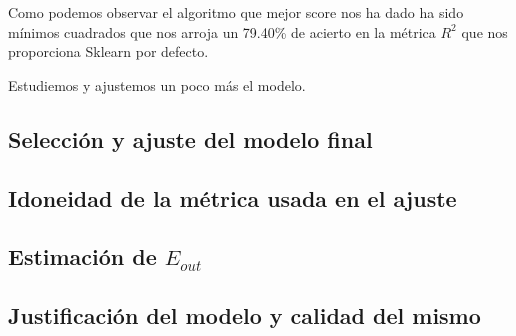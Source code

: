 \documentclass[12pt,a4paper]{article}
\begin{document}
Como podemos observar el algoritmo que mejor score nos ha dado ha sido mínimos cuadrados que nos arroja un 79.40\% de acierto en la métrica $R^2$ que nos proporciona Sklearn por defecto. 

Estudiemos y ajustemos un poco más el modelo.

\subsection{Selección y ajuste del modelo final}

\subsection{Idoneidad de la métrica usada en el ajuste}

\subsection{Estimación de $E_{out}$}

\subsection{Justificación del modelo y calidad del mismo}
\end{document}
